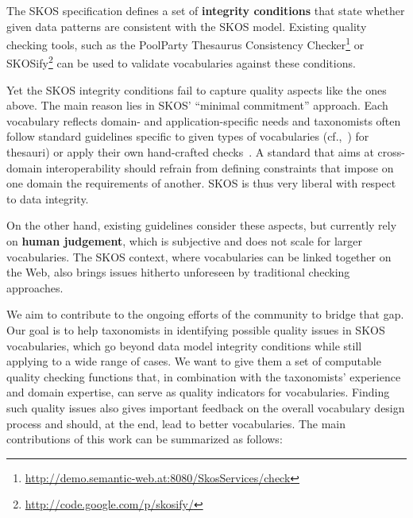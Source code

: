 
The SKOS specification defines a set of \textbf{integrity conditions} that state whether given data patterns are consistent with the SKOS model. Existing quality checking tools, such as the PoolParty Thesaurus Consistency Checker\footnote{\url{http://demo.semantic-web.at:8080/SkosServices/check}} or SKOSify\footnote{\url{http://code.google.com/p/skosify/}} can be used to validate vocabularies against these conditions.

Yet the SKOS integrity conditions fail to capture quality aspects like the ones above. The main reason lies in SKOS' ``minimal commitment'' approach. Each vocabulary reflects domain- and application-specific needs and taxonomists often follow standard guidelines specific to given types of vocabularies (cf.,~\cite{ISO25964-1:2011,Z39.19:2005}) for thesauri) or apply their own hand-crafted checks~\cite{Coronado2009}. A standard that aims at cross-domain interoperability should refrain from defining constraints that impose on one domain the requirements of another. SKOS is thus very liberal with respect to data integrity.

On the other hand, existing guidelines consider these aspects, but currently rely on \textbf{human judgement}, which is subjective and does not scale for larger vocabularies. The SKOS context, where vocabularies can be linked together on the Web, also brings issues hitherto unforeseen by traditional checking approaches.


We aim to contribute to the ongoing efforts of the community to bridge that gap. Our goal is to help taxonomists in identifying possible quality issues in SKOS vocabularies, which go beyond data model integrity conditions while still applying to a wide range of cases. We want to give them a set of computable quality checking functions that, in combination with the taxonomists' experience and domain expertise, can serve as quality indicators for vocabularies. Finding such quality issues also gives important feedback on the overall vocabulary design process and should, at the end, lead to better vocabularies. The main contributions of this work can be summarized as follows:

